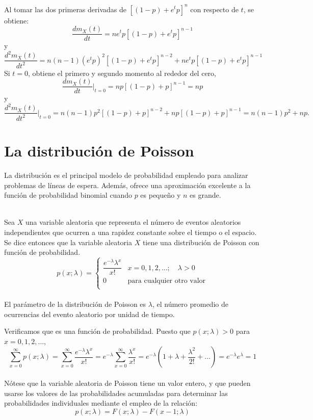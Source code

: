 Al tomar las dos primeras derivadas de $[(1-p)+e^tp]^n$ con respecto de $t$, se obtiene:
$$\dfrac{dm_X(t)}{dt} = ne^t p [(1-p)+e^t p]^{n-1}$$
y
$$\dfrac{d^2m_X (t)}{dt^2}=n(n-1)(e^t p)^2[(1-p)+e^tp]^{n-2}+ne^t p[(1-p)+e^t p]^{n-1}$$
Si $t=0$, obtiene el primero y segundo momento al rededor del cero,
$$\dfrac{dm_X(t)}{dt}\bigg|_{t=0} = np[(1-p)+p]^{n-1} = np$$
y
$$\dfrac{d^2m_X(t)}{dt^2}\bigg|_{t=0} = n(n-1)p^2[(1-p)+p]^{n-2} + np[(1-p)+p]^{n-1}=n(n-1)p^2 + np.$$


\section{La distribución de Poisson}
La distribución es el principal modelo de probabilidad empleado para analizar problemas de líneas de espera. Además, ofrece una aproximación excelente a la función de probabilidad binomial cuando $p$ es pequeño y $n$ es grande.\\\\

\begin{tcolorbox}[colback=white]
    \begin{def.}
	Sea $X$ una variable aleatoria que representa el número de eventos aleatorios independientes que ocurren a una rapidez constante sobre el tiempo o el espacio. Se dice entonces que la variable aleatoria $X$ tiene una distribución de Poisson con función de probabilidad.
	$$p(x;\lambda)=\left\{\begin{array}{ll}
		\dfrac{e^{-\lambda}\lambda^x}{x!} & x=0,1,2,\ldots; \quad \lambda > 0\\
		0&\mbox{para cualquier otro valor}\\
	\end{array}\right.$$\\
	El parámetro de la distribución de Poisson es $\lambda$, el número promedio de ocurrencias del evento aleatorio por unidad de tiempo.
    \end{def.}
\end{tcolorbox}
Verificamos que es una función de probabilidad. Puesto que $p(x;\lambda)>0$ para $x=0,1,2,\ldots$,
$$\sum_{x=0}^\infty p(x;\lambda) = \sum_{x=0}^\infty \dfrac{e^{-\lambda}\lambda^x}{x!} = e^{-\lambda}\sum_{x=0}^\infty \dfrac{\lambda^x}{x!}=e^{-\lambda}\left(1+\lambda + \dfrac{\lambda^2}{2!}+\ldots\right) = e^{-\lambda}e^{\lambda}=1$$\\

Nótese que la variable aleatoria de Poisson tiene un valor entero, y que pueden usarse los valores de las probabilidades acumuladas para determinar las probabilidades individuales mediante el empleo de la relación:
$$p(x;\lambda) = F(x;\lambda)-F(x-1;\lambda)$$\\

